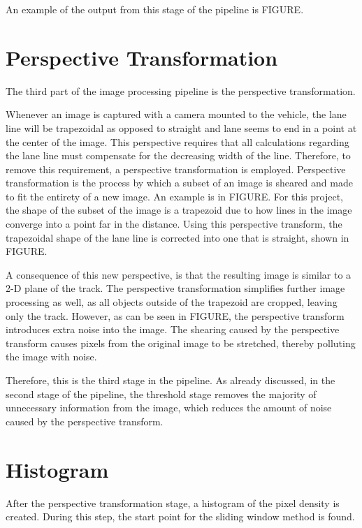 \documentclass[arbeit=studie,oneside,BCOR=12mm]{ArbeitRST}
\begin{document}
An example of the output from this stage of the pipeline is FIGURE.

\section{Perspective Transformation}

The third part of the image processing pipeline is the perspective 
transformation. 

Whenever an image is captured with a camera mounted to the vehicle, the lane
line will be trapezoidal as opposed to straight and lane seems to end in a
point at the center of the image. This perspective requires that all
calculations regarding the lane line must compensate for the decreasing width
of the line. Therefore, to remove this requirement, a perspective
transformation is employed. Perspective transformation is the process by which
a subset of an image is sheared and made to fit the entirety of a new image. An
example is in FIGURE. For this project, the shape of the subset of the image is
a trapezoid due to how lines in the image converge into a point far in the
distance. Using this perspective transform, the trapezoidal shape of the lane
line is corrected into one that is straight, shown in FIGURE.

A consequence of this new perspective, is that the resulting image is similar
to a 2-D plane of the track. The perspective transformation simplifies further
image processing as well, as all objects outside of the trapezoid are cropped,
leaving only the track. However, as can be seen in FIGURE, the perspective
transform introduces extra noise into the image. The shearing caused by the
perspective transform causes pixels from the original image to be stretched,
thereby polluting the image with noise. 

Therefore, this is the third stage in the pipeline. As already discussed, in 
the second stage of the pipeline, the threshold stage removes the majority of 
unnecessary information from the image, which reduces the amount of noise 
caused by the perspective transform.

\section{Histogram}

After the perspective transformation stage, a histogram of the pixel density 
is created. During this step, the start point for the sliding window method is
found. 
\end{document}
